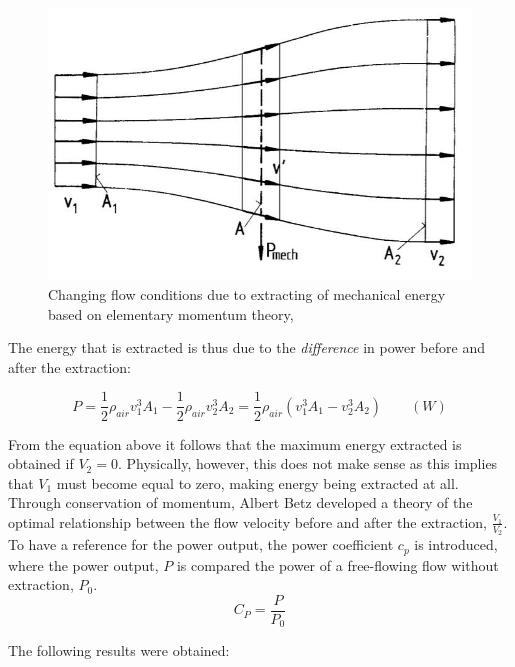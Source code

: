 \begin{figure}[H]
\centering
\includegraphics[scale=0.6]{figures/flow}
\caption[$\; \:$Changing flow conditions due to extracting of mechanical]{Changing flow conditions due to extracting of mechanical energy based on elementary momentum theory, \cite{Hau2013} }
 \label{fig:flow}
\end{figure}

\noindent The energy that is extracted is thus due to the \textit{difference} in power before and after the extraction: 

\begin{equation}
    P = \frac{1}{2}\rho_{air} v^3_1 A_1 - \frac{1}{2}\rho_{air} v^3_2 A_2 =\frac{1}{2}\rho_{air}( v^3_1 A_1 - v^3_2 A_2) \qquad (W)
\end{equation}

\noindent From the equation above it follows that the maximum energy extracted is obtained if $V_2=0$. Physically, however, this does not make sense as this implies that $V_1$ must become equal to zero, making energy being extracted at all. Through conservation of momentum, Albert Betz developed a theory of the optimal relationship between the flow velocity before and after the extraction, $\frac{V_1}{V_2}$. To have a reference for the power output, the power coefficient $c_p$ is introduced, where the power output, $P$  is compared the power of a free-flowing flow without extraction, $P_0$. 
  \begin{equation}
    C_P = \frac{P}{P_0}
\end{equation}

\noindent The following results were obtained: 

